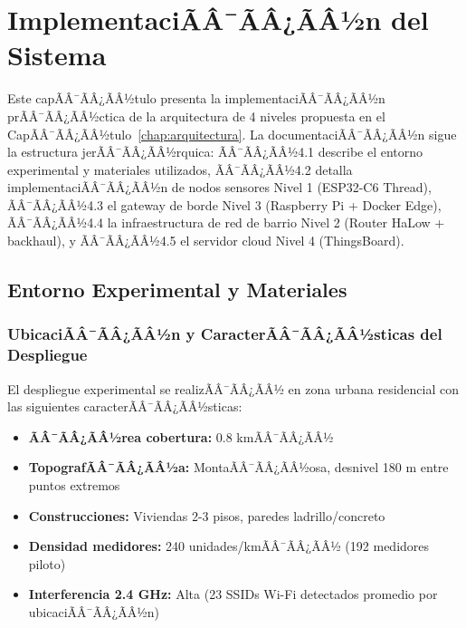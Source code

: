 ﻿\chapter{ImplementaciÃÂ¯ÃÂ¿ÃÂ½n del Sistema}
\label{chap:implementacion}


Este capÃÂ¯ÃÂ¿ÃÂ½tulo presenta la implementaciÃÂ¯ÃÂ¿ÃÂ½n prÃÂ¯ÃÂ¿ÃÂ½ctica de la arquitectura de 4 niveles propuesta en el CapÃÂ¯ÃÂ¿ÃÂ½tulo~\ref{chap:arquitectura}. La documentaciÃÂ¯ÃÂ¿ÃÂ½n sigue la estructura jerÃÂ¯ÃÂ¿ÃÂ½rquica: ÃÂ¯ÃÂ¿ÃÂ½4.1 describe el entorno experimental y materiales utilizados, ÃÂ¯ÃÂ¿ÃÂ½4.2 detalla implementaciÃÂ¯ÃÂ¿ÃÂ½n de nodos sensores Nivel 1 (ESP32-C6 Thread), ÃÂ¯ÃÂ¿ÃÂ½4.3 el gateway de borde Nivel 3 (Raspberry Pi + Docker Edge), ÃÂ¯ÃÂ¿ÃÂ½4.4 la infraestructura de red de barrio Nivel 2 (Router HaLow + backhaul), y ÃÂ¯ÃÂ¿ÃÂ½4.5 el servidor cloud Nivel 4 (ThingsBoard).\section{Entorno Experimental y Materiales}
\label{sec:impl-entorno}

\subsection{UbicaciÃÂ¯ÃÂ¿ÃÂ½n y CaracterÃÂ¯ÃÂ¿ÃÂ½sticas del Despliegue}

El despliegue experimental se realizÃÂ¯ÃÂ¿ÃÂ½ en zona urbana residencial con las siguientes caracterÃÂ¯ÃÂ¿ÃÂ½sticas:

\begin{itemize}
    \item \textbf{ÃÂ¯ÃÂ¿ÃÂ½rea cobertura:} 0.8 kmÃÂ¯ÃÂ¿ÃÂ½
    \item \textbf{TopografÃÂ¯ÃÂ¿ÃÂ½a:} MontaÃÂ¯ÃÂ¿ÃÂ½osa, desnivel 180 m entre puntos extremos
    \item \textbf{Construcciones:} Viviendas 2-3 pisos, paredes ladrillo/concreto
    \item \textbf{Densidad medidores:} 240 unidades/kmÃÂ¯ÃÂ¿ÃÂ½ (192 medidores piloto)
    \item \textbf{Interferencia 2.4 GHz:} Alta (23 SSIDs Wi-Fi detectados promedio por ubicaciÃÂ¯ÃÂ¿ÃÂ½n)
\end{itemize}

